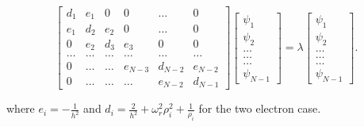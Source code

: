 \documentclass[twoside,onecolumn]{article}
\begin{document}
\begin{equation*}
    \begin{bmatrix}d_1 & e_1 & 0   & 0    & \dots  &0   \\
                                e_1 & d_2 & e_2 & 0    & \dots  &0  \\
                                0   & e_2 & d_3 & e_3  &0       &0\\
                                \dots  & \dots & \dots & \dots  &\dots      &\dots\\
                                0   & \dots & \dots & e_{N-3} & d_{N-2} & e_{N-2}\\
                                0   & \dots & \dots & \dots  &e_{N-2} & d_{N-1}
             \end{bmatrix}  \begin{bmatrix} \psi_{1} \\
                                                              \psi_{2} \\
                                                              \dots\\ \dots\\ \dots\\
                                                              \psi_{N-1}
             \end{bmatrix}=\lambda \begin{bmatrix} \psi_{1} \\
                                                              \psi_{2} \\
                                                              \dots\\ \dots\\ \dots\\
                                                              \psi_{N-1}
             \end{bmatrix}.  
\end{equation*}

\bigskip

where $e_i = -\frac{1}{h^2}$ and $d_i = \frac{2}{h^2} + \omega_r^2\rho_i^2 + \frac{1}{\rho_i}$ for the two electron case.



\end{document}
